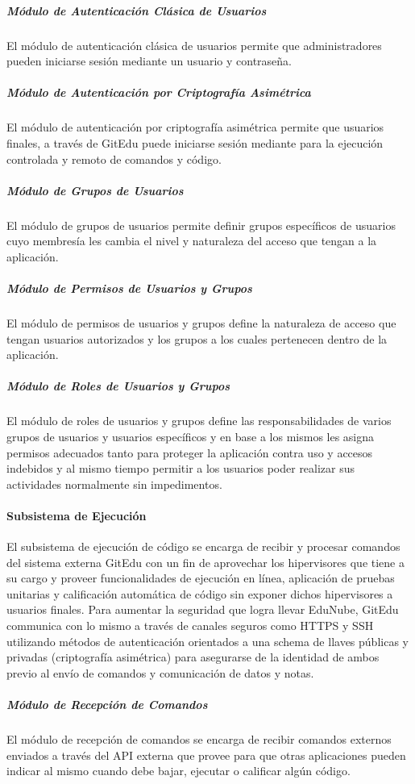 \subparagraph{Módulo de Autenticación Clásica de Usuarios}
El módulo de autenticación clásica de usuarios permite que administradores pueden iniciarse sesión mediante un usuario y contraseña.

\subparagraph{Módulo de Autenticación por Criptografía Asimétrica}
El módulo de autenticación por criptografía asimétrica permite que usuarios finales, a través de GitEdu puede iniciarse sesión mediante para la ejecución controlada y remoto de comandos y código.

\subparagraph{Módulo de Grupos de Usuarios}
El módulo de grupos de usuarios permite definir grupos específicos de usuarios cuyo membresía les cambia el nivel y naturaleza del acceso que tengan a la aplicación.

\subparagraph{Módulo de Permisos de Usuarios y Grupos}
El módulo de permisos de usuarios y grupos define la naturaleza de acceso que tengan usuarios autorizados y los grupos a los cuales pertenecen dentro de la aplicación.

\subparagraph{Módulo de Roles de Usuarios y Grupos}
El módulo de roles de usuarios y grupos define las responsabilidades de varios grupos de usuarios y usuarios específicos y en base a los mismos les asigna permisos adecuados tanto para proteger la aplicación contra uso y accesos indebidos y al mismo tiempo permitir a los usuarios poder realizar sus actividades normalmente sin impedimentos.

\paragraph{Subsistema de Ejecución}
El subsistema de ejecución de código se encarga de recibir y procesar  comandos del sistema externa GitEdu con un fin de aprovechar los hipervisores que tiene a su cargo y proveer funcionalidades de ejecución en línea, aplicación de pruebas unitarias y calificación automática de código sin exponer dichos hipervisores a usuarios finales. Para aumentar la seguridad que logra llevar EduNube, GitEdu communica con lo mismo a través de canales seguros como HTTPS y SSH utilizando métodos de autenticación orientados a una schema de llaves públicas y privadas (criptografía asimétrica) para asegurarse de la identidad de ambos previo al envío de comandos y comunicación de datos y notas.

\subparagraph{Módulo de Recepción de Comandos}
El módulo de recepción de comandos se encarga de recibir comandos externos enviados a través del API externa que provee para que otras aplicaciones pueden indicar al mismo cuando debe bajar, ejecutar o calificar algún código.

